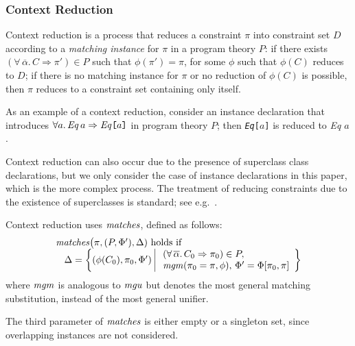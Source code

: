 \subsubsection{Context Reduction}
\label{sec:context-reduction}

Context reduction is a process that reduces a constraint $\pi$ into
constraint set $D$ according to a {\it matching instance\/} for $\pi$
in a program theory $P$: if there exists
$(\forall\,\overline{\alpha}.\,C\Rightarrow \pi')\in P$ such that
$\phi(\pi') = \pi$, for some $\phi$ such that $\phi(C)$ reduces to
$D$; if there is no matching instance for $\pi$ or no reduction of
$\phi(C)$ is possible, then $\pi$ reduces to a constraint set
containing only itself.


As an example of a context reduction, consider an instance declaration
that introduces $\forall a.\,{\it Eq\/}\, a \Rightarrow \text{\tt {\it
    Eq\/}[$a$]}$ in program theory $P$; then {\tt {\it Eq\/}[$a$]} is
reduced to {\it Eq\/} $a$.

Context reduction can also occur due to the presence of superclass
class declarations, but we only consider the case of instance
declarations in this paper, which is the more complex process. The
treatment of reducing constraints due to the existence of superclasses
is standard; see e.g.~\cite{MarkJones94a,Hall96,Faxen2002}.

Context reduction uses $\text{\it matches\/}$, defined as follows:
  \[ \begin{array}{l}
        \text{\it matches\/}\bigl(\pi,(P,\Phi'), \Delta) \text{ holds if }\\
          \:\:\:\: \Delta = \left\{ (\phi(C_0), \pi_0, \Phi')\,\,
          						\begin{array}{|l}
                             		\,\,(\forall\,\overline{\alpha}.\,C_0\Rightarrow \pi_0) \in P,\\
                             		\,\,\rm {\it mgm\/}(\pi_0 = \pi,\phi),\, \Phi' = \Phi[\pi_0,\pi]
                             	\end{array}\right\}
     \end{array}
  \]
where $\rm {\it mgm\/}$ is analogous to $\rm{\it mgu\/}$ but denotes the most general
matching substitution, instead of the most general unifier.

The third parameter of $\text{\it matches\/}$ is either empty or a singleton set,
since overlapping instances \cite{ghc-users-guide} are not considered.

